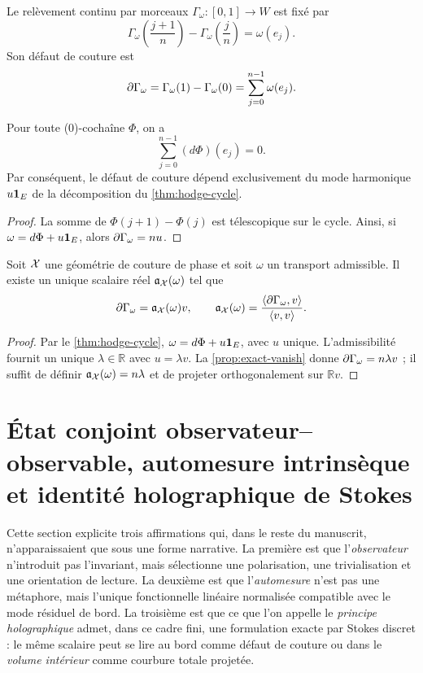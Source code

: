 \begin{definition}
Le relèvement continu par morceaux \(\Gamma_\omega:[0,1]\to W\) est fixé par
\[
 \Gamma_\omega\!\left(\frac{j+1}{n}\right)
 -\Gamma_\omega\!\left(\frac jn\right)=\omega(e_j).
\]
Son défaut de couture est
\[
 \partial\Gamma_\omega
 =\Gamma_\omega(1)-\Gamma_\omega(0)
 =\sum_{j=0}^{n-1}\omega(e_j).
\]
\end{definition}

\begin{proposition}
\label{prop:exact-vanish}
Pour toute (0)-cochaîne \(\Phi\), on a
\[
 \sum_{j=0}^{n-1}(d\Phi)(e_j)=0.
\]
Par conséquent, le défaut de couture dépend exclusivement du mode
harmonique \(u\mathbf 1_E\) de la décomposition du
\cref{thm:hodge-cycle}.
\end{proposition}

\begin{proof}
La somme de \(\Phi(j+1)-\Phi(j)\) est télescopique sur le cycle. Ainsi, si
\(\omega=d\Phi+u\mathbf 1_E\), alors
\(\partial\Gamma_\omega=nu\).
\end{proof}

\begin{theorem}
\label{thm:universal-sewing}
Soit \(\mathcal X\) une géométrie de couture de phase et soit \(\omega\) un transport
admissible. Il existe un unique scalaire réel \(\mathfrak a_\mathcal X(\omega)\) tel que
\[
 \partial\Gamma_\omega=\mathfrak a_\mathcal X(\omega)v,
 \qquad
 \mathfrak a_\mathcal X(\omega)
 =\frac{\langle\partial\Gamma_\omega,v\rangle}{\langle v,v\rangle}.
\]
\end{theorem}

\begin{proof}
Par le \cref{thm:hodge-cycle}, \(\omega=d\Phi+u\mathbf 1_E\), avec \(u\) unique.
L'admissibilité fournit un unique \(\lambda\in\mathbb R\) avec
\(u=\lambda v\). La \cref{prop:exact-vanish} donne
\(\partial\Gamma_\omega=n\lambda v\) ; il suffit de définir
\(\mathfrak a_\mathcal X(\omega)=n\lambda\) et de projeter orthogonalement sur
\(\mathbb Rv\).
\end{proof}

\section{État conjoint observateur--observable, automesure intrinsèque et identité holographique de Stokes}\label{sec:observer-holo}

Cette section explicite trois affirmations qui, dans le reste du manuscrit, n'apparaissaient
que sous une forme narrative. La première est que l'\emph{observateur} n'introduit pas l'invariant,
mais sélectionne une polarisation, une trivialisation et une orientation de lecture.
La deuxième est que l'\emph{automesure} n'est pas une métaphore, mais l'unique fonctionnelle linéaire
normalisée compatible avec le mode résiduel de bord. La troisième est que ce que l'on appelle le
\emph{principe holographique} admet, dans ce cadre fini, une formulation exacte par
Stokes discret : le même scalaire peut se lire au bord comme défaut de couture ou dans le
\emph{volume intérieur} comme courbure totale projetée.

